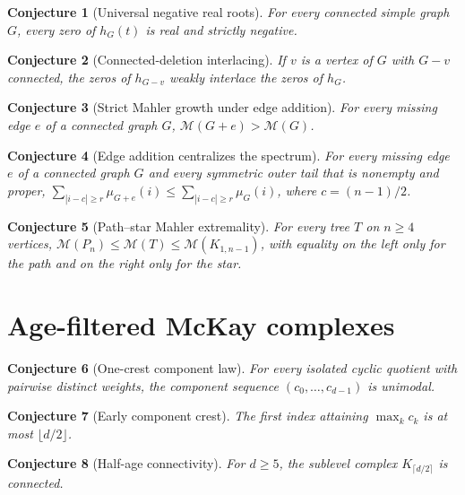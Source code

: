 \documentclass[11pt]{article}
\newtheorem{conjecture}{Conjecture}
\theoremstyle{definition}
\begin{document}
\begin{conjecture}[Universal negative real roots]\label{z1}
For every connected simple graph $G$, every zero of $h_G(t)$ is real and strictly negative.
\end{conjecture}

\begin{conjecture}[Connected-deletion interlacing]\label{z2}
If $v$ is a vertex of $G$ with $G-v$ connected, the zeros of $h_{G-v}$ weakly interlace the zeros of $h_G$.
\end{conjecture}

\begin{conjecture}[Strict Mahler growth under edge addition]\label{z3}
For every missing edge $e$ of a connected graph $G$, $\mathcal M(G+e)>\mathcal M(G)$.
\end{conjecture}

\begin{conjecture}[Edge addition centralizes the spectrum]\label{z4}
For every missing edge $e$ of a connected graph $G$ and every symmetric outer tail that is nonempty and proper, $\sum_{|i-c|\ge r}\mu_{G+e}(i)\le\sum_{|i-c|\ge r}\mu_G(i)$, where $c=(n-1)/2$.
\end{conjecture}

\begin{conjecture}[Path--star Mahler extremality]\label{z5}
For every tree $T$ on $n\ge4$ vertices, $\mathcal M(P_n)\le\mathcal M(T)\le\mathcal M(K_{1,n-1})$, with equality on the left only for the path and on the right only for the star.
\end{conjecture}

\section{Age-filtered McKay complexes}

\begin{conjecture}[One-crest component law]\label{z6}
For every isolated cyclic quotient with pairwise distinct weights, the component sequence $(c_0,\ldots,c_{d-1})$ is unimodal.
\end{conjecture}

\begin{conjecture}[Early component crest]\label{z7}
The first index attaining $\max_kc_k$ is at most $\lfloor d/2\rfloor$.
\end{conjecture}

\begin{conjecture}[Half-age connectivity]\label{z8}
For $d\ge5$, the sublevel complex $K_{\lceil d/2\rceil}$ is connected.
\end{conjecture}
\end{document}
